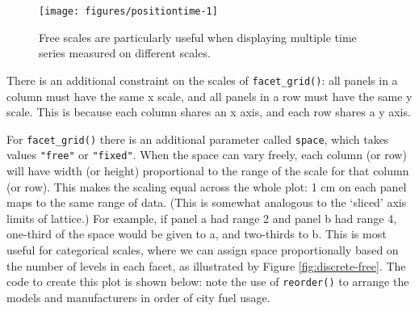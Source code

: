 \begin{figure}

{\centering \texttt{[image: figures/positiontime-1]} 

}

\caption{Free scales are particularly useful when displaying multiple time series measured on different scales.\label{fig:time}}
\end{figure}

There is an additional constraint on the scales of
\texttt{facet\_grid()}: all panels in a column must have the same x
scale, and all panels in a row must have the same y scale. This is
because each column shares an x axis, and each row shares a y axis.

For \texttt{facet\_grid()} there is an additional parameter called
\texttt{space}, which takes values \texttt{"free"} or \texttt{"fixed"}.
When the space can vary freely, each column (or row) will have width (or
height) proportional to the range of the scale for that column (or row).
This makes the scaling equal across the whole plot: 1 cm on each panel
maps to the same range of data. (This is somewhat analogous to the
`sliced' axis limits of lattice.) For example, if panel a had range 2
and panel b had range 4, one-third of the space would be given to a, and
two-thirds to b. This is most useful for categorical scales, where we
can assign space proportionally based on the number of levels in each
facet, as illustrated by Figure \ref{fig:discrete-free}. The code to
create this plot is shown below: note the use of \texttt{reorder()} to
arrange the models and manufacturers in order of city fuel usage.

\begin{Shaded}
\begin{Highlighting}[]
\StringTok{ }
  \StringTok{ }
  \StringTok{ }
\NormalTok{\})}
\StringTok{ } 

\StringTok{ }\StringTok{ } \NormalTok{, }
   \NormalTok{) +}\StringTok{ }\NormalTok{(} \NormalTok{(} \NormalTok{))}
\end{Highlighting}
\end{Shaded}

